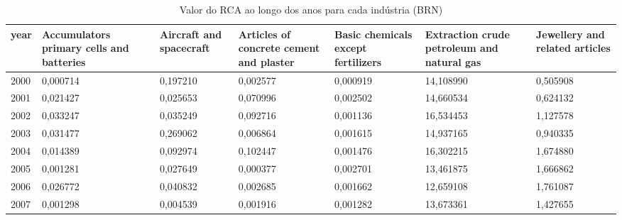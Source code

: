 \begin{table}
\centering
\caption{Valor do RCA ao longo dos anos para cada indústria (BRN)}
\begin{tabular}{p{1cm}p{2cm}p{2cm}p{2cm}p{2cm}p{2cm}p{2cm}}
\toprule
 year &  Accumulators primary cells and batteries &  Aircraft and spacecraft &  Articles of concrete cement and plaster &  Basic chemicals except fertilizers &  Extraction crude petroleum and natural gas &  Jewellery and related articles \\
\midrule
 2000 &                                  0,000714 &                 0,197210 &                                 0,002577 &                            0,000919 &                                   14,108990 &                        0,505908 \\
 2001 &                                  0,021427 &                 0,025653 &                                 0,070996 &                            0,002502 &                                   14,660534 &                        0,624132 \\
 2002 &                                  0,033247 &                 0,035249 &                                 0,092716 &                            0,001136 &                                   16,534453 &                        1,127578 \\
 2003 &                                  0,031477 &                 0,269062 &                                 0,006864 &                            0,001615 &                                   14,937165 &                        0,940335 \\
 2004 &                                  0,014389 &                 0,092974 &                                 0,102447 &                            0,001476 &                                   16,302215 &                        1,674880 \\
 2005 &                                  0,001281 &                 0,027649 &                                 0,000377 &                            0,002701 &                                   13,461875 &                        1,666862 \\
 2006 &                                  0,026772 &                 0,040832 &                                 0,002685 &                            0,001662 &                                   12,659108 &                        1,761087 \\
 2007 &                                  0,001298 &                 0,004539 &                                 0,001916 &                            0,001282 &                                   13,673361 &                        1,427655 \\

\end{tabular}
\end{table}
